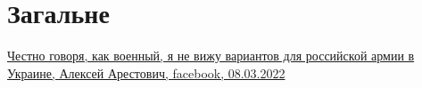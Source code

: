  
 
 
 
 
\section{Загальне}
\label{sec:topics.vojna.zagalne}

\hyperlink{08_03_2022.fb.arestovich_alexei.1.varianty}{%
Честно говоря, как военный, я не вижу вариантов для российской армии в Украине, Алексей Арестович, %
facebook, 08.03.2022%
}
